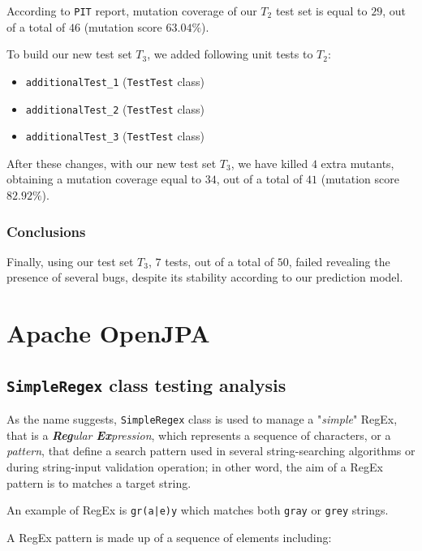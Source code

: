 \documentclass[sigconf]{acmart}
\begin{document}
According to \texttt{PIT} report, mutation coverage of our $T_2$ test set is equal to $29$, out of a total of $46$ (mutation score $63.04 \%$). 

To build our new test set $T_3$, we added following unit tests to $T_2$:

\begin{itemize}
\item \texttt{additionalTest\_1} (\texttt{TestTest} class)
\item \texttt{additionalTest\_2} (\texttt{TestTest} class)
\item \texttt{additionalTest\_3} (\texttt{TestTest} class)
\end{itemize}

After these changes, with our new test set $T_3$, we have killed $4$ extra mutants, obtaining a mutation coverage equal to $34$, out of a total of $41$ (mutation score $82.92 \%$).

\subsubsection{Conclusions}

Finally, using our test set $T_3$, $7$ tests, out of a total of $50$, failed revealing the presence of several bugs, despite its stability according to our prediction model.

\section{Apache OpenJPA\texttrademark}

\subsection{\texttt{SimpleRegex} class testing analysis}

As the name suggests, \texttt{SimpleRegex} class is used to manage a "\textit{simple}" RegEx, that is a \textit{\textbf{Reg}ular \textbf{Ex}pression}, which represents a sequence of characters, or a \textit{pattern}, that define a search pattern used in several string-searching algorithms or during string-input validation operation; in other word, the aim of a RegEx pattern is to matches a target string.

An example of RegEx is \colorbox{beaublue}{\texttt{gr(a|e)y}} which matches both \colorbox{beaublue}{\texttt{gray}} or \colorbox{beaublue}{\texttt{grey}} strings.

A RegEx pattern is made up of a sequence of elements including:
\end{document}
